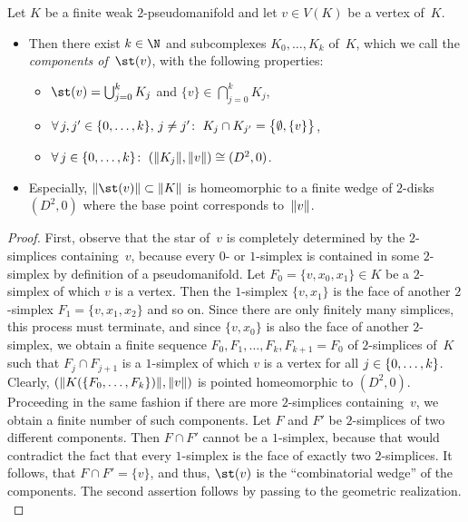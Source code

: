 \begin{thProposition}
    \label{ch4:starinpmfd}
    Let $K$ be a finite weak $2$-pseudo\-manifold and let $v\in V(K)$ be a vertex
    of~$K$.
    \begin{itemize}
        \item
            Then there exist $k\in\N$ and subcomplexes $K_0,\dots,K_k$ of~$K$,
            which we call the \emph{components of~$\st(v)$}, with the following
            properties:
            \begin{itemize}[labelsep=3mm,leftmargin=!]
                \item
                    $\st(v) = \bigcup_{j=0}^k K_j$
                    and $\{v\} \in \bigcap_{j=0}^k K_j$,
                \item
                    $\forall\,j,j'\in\{0,\ldots,k\},\,j\neq j'\colon\;
                    K_j\cap K_{j'} = \bigl\{\emptyset, \{v\}\bigr\}$,
                \item
                    $\forall\,j\in\{0,\ldots,k\}\colon\;
                    (\lVert K_j\rVert,\lVert v\rVert) \cong (D^2,0)$.
            \end{itemize}
            
        \item
            Especially, $\geom{\st(v)}\subset\geom{K}$ is homeomorphic to a
            finite wedge of $2$-disks~$(D^2,0)$ where the base point corresponds
            to~$\lVert v\rVert$.
    \end{itemize}
\end{thProposition}

\begin{proof}
    First, observe that the star of~$v$ is completely determined by the
    $2$-simplices containing~$v$, because every $0$- or $1$-simplex is
    contained in some $2$-simplex by definition of a pseudomanifold.
    Let $F_0=\{v,x_0,x_1\}\in K$ be a
    $2$-simplex of which $v$ is a vertex. Then the $1$-simplex
    $\{v,x_1\}$ is the face of another $2$-simplex $F_1=\{v,x_1,x_2\}$
    and so on. Since there are only finitely many simplices, this process
    must terminate, and since $\{v,x_0\}$ is also the face of another
    $2$-simplex, we obtain a finite sequence $F_0,F_1,\dots,F_k,F_{k+1}=F_0$
    of $2$-simplices of~$K$ such that $F_j\cap F_{j+1}$ is a $1$-simplex
    of which $v$ is a vertex for all $j\in\{0,\ldots,k\}$. %
    Clearly, $(\lVert K(\{F_0,\dots,F_k\})\rVert,\lVert v\rVert)$ is pointed
    homeomorphic to $(D^2,0)$. Proceeding in the same fashion if there are more
    $2$-simplices containing~$v$, we obtain a finite number of such components.
    Let $F$ and $F'$ be $2$-simplices of two different components.
    Then $F\cap F'$ cannot be a $1$-simplex, because that would contradict
    the fact that every $1$-simplex is the face of exactly two $2$-simplices.
    It follows, that $F\cap F' = \{v\}$, and thus, $\st(v)$ is the
    \enquote{combinatorial wedge} of the components. The second assertion
    follows by passing to the geometric realization.
    \\
\end{proof}

